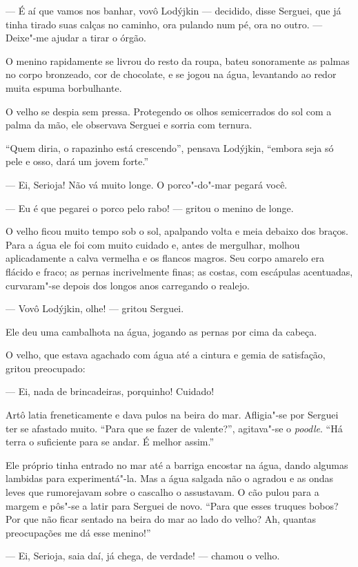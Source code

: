 --- É aí que vamos nos banhar, vovô Lodýjkin --- decidido, disse
Serguei, que já tinha tirado suas calças no caminho, ora pulando num pé,
ora no outro. --- Deixe"-me ajudar a tirar o órgão.

O menino rapidamente se livrou do resto da roupa, bateu sonoramente as
palmas no corpo bronzeado, cor de chocolate, e se jogou na água,
levantando ao redor muita espuma borbulhante.

O velho se despia sem pressa. Protegendo os olhos semicerrados do sol
com a palma da mão, ele observava Serguei e sorria com ternura.

``Quem diria, o rapazinho está crescendo'', pensava Lodýjkin, ``embora
seja só pele e osso, dará um jovem forte.''

--- Ei, Serioja! Não vá muito longe. O porco"-do"-mar pegará você.

--- Eu é que pegarei o porco pelo rabo! --- gritou o menino de longe.

O velho ficou muito tempo sob o sol, apalpando volta e meia debaixo dos
braços. Para a água ele foi com muito cuidado e, antes de mergulhar,
molhou aplicadamente a calva vermelha e os flancos magros. Seu corpo
amarelo era flácido e fraco; as pernas incrivelmente finas; as costas,
com escápulas acentuadas, curvaram"-se depois dos longos anos carregando
o realejo.

--- Vovô Lodýjkin, olhe! --- gritou Serguei.

Ele deu uma cambalhota na água, jogando as pernas por cima da cabeça.

O velho, que estava agachado com água até a cintura e gemia de
satisfação, gritou preocupado:

--- Ei, nada de brincadeiras, porquinho! Cuidado!

Artô latia freneticamente e dava pulos na beira do mar. Afligia"-se por
Serguei ter se afastado muito. ``Para que se fazer de valente?'',
agitava"-se o \emph{poodle}. ``Há terra o suficiente para se andar. É
melhor assim.''

Ele próprio tinha entrado no mar até a barriga encostar na água, dando
algumas lambidas para experimentá"-la. Mas a água salgada não o agradou e
as ondas leves que rumorejavam sobre o cascalho o assustavam. O cão
pulou para a margem e pôs"-se a latir para Serguei de novo. ``Para que
esses truques bobos? Por que não ficar sentado na beira do mar ao lado
do velho? Ah, quantas preocupações me dá esse menino!''

--- Ei, Serioja, saia daí, já chega, de verdade! --- chamou o velho.

